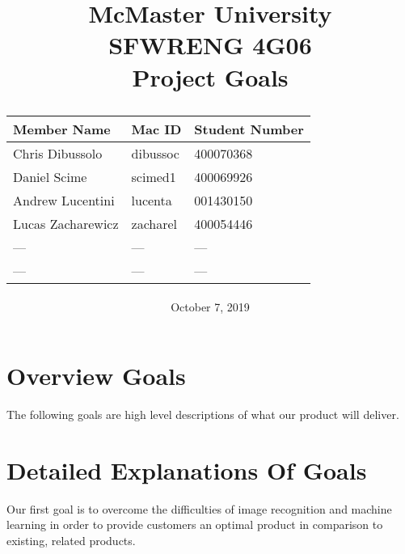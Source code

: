 \documentclass[12pt, titlepage]{article}
\title{
McMaster University\\
SFWRENG 4G06\\
\bigskip\bigskip\bigskip
{\bf Project Goals\\}
\bigskip\bigskip\bigskip\bigskip
\begin{table}[h!]
\begin{center}
\begin{tabular}{|p{5cm}|p{5cm}|p{5cm}|}
	\hline
	\bf Member Name & \bf Mac ID & \bf Student Number\\
	\hline
	\hline
	Chris Dibussolo & dibussoc & 400070368\\
	\hline
	Daniel Scime & scimed1 & 400069926\\
	\hline
    Andrew Lucentini & lucenta & 001430150\\
	\hline
    Lucas Zacharewicz & zacharel & 400054446\\
	\hline
  --- & --- & ---\\
	\hline
  --- & --- & ---\\
	\hline
\end{tabular}
\end{center}
\end{table}
\date{October 7, 2019}
}
\begin{document}
\maketitle

\newpage


\section{Overview Goals}

The following goals are high level descriptions of what our product will deliver.

\section{Detailed Explanations Of Goals}

Our first goal is to overcome the difficulties of image recognition and machine learning in order to provide customers an optimal product in comparison to existing, related products.
\end{document}
